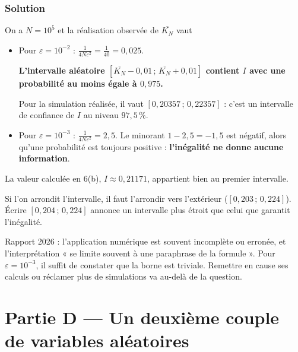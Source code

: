 \documentclass[11pt,a4paper]{article}
\newcommand{\equationajustee}[1]{%
  \sbox{\boiteequation}{$\displaystyle #1$}%
  \ifdim\wd\boiteequation>\linewidth
    \[\resizebox{\linewidth}{!}{\usebox{\boiteequation}}\]%
  \else
    \[#1\]%
  \fi}
\begin{document}
\hypertarget{solution-35}{%
\subsubsection{Solution}\label{solution-35}}

On a \(N=10^5\) et la réalisation observée de \(\overline{K_N}\) vaut

\equationajustee{\overline{K_N}=\frac{21\,357}{100\,000}=0{,}21357.}

\begin{itemize}
\item
  Pour \(\varepsilon=10^{-2}\) : \(\frac1{4N\varepsilon^2}=\frac1{40}=0{,}025\).

  \textbf{L'intervalle aléatoire \([\overline{K_N}-0{,}01\,;\,\overline{K_N}+0{,}01]\) contient \(I\) avec une probabilité au moins égale à \(0{,}975\).}

  Pour la simulation réalisée, il vaut \([0{,}20357\,;\,0{,}22357]\) : c'est un intervalle de confiance de \(I\) au niveau \(97{,}5\,\%\).
\item
  Pour \(\varepsilon=10^{-3}\) : \(\frac1{4N\varepsilon^2}=2{,}5\). Le minorant \(1-2{,}5=-1{,}5\) est négatif, alors qu'une probabilité est toujours positive : \textbf{l'inégalité ne donne aucune information}.
\end{itemize}

La valeur calculée en 6(b), \(I\approx0{,}21171\), appartient bien au premier intervalle.

\begin{piege}

Si l'on arrondit l'intervalle, il faut l'arrondir vers l'extérieur (\([0{,}203\,;\,0{,}224]\)). Écrire \([0{,}204\,;\,0{,}224]\) annonce un intervalle plus étroit que celui que garantit l'inégalité.

\end{piege}

\begin{jury}

Rapport 2026 : l'application numérique est souvent incomplète ou erronée, et l'interprétation « se limite souvent à une paraphrase de la formule ». Pour \(\varepsilon=10^{-3}\), il suffit de constater que la borne est triviale. Remettre en cause ses calculs ou réclamer plus de simulations va au-delà de la question.

\end{jury}

\hypertarget{partie-d-un-deuxiuxe8me-couple-de-variables-aluxe9atoires}{%
\section{Partie D --- Un deuxième couple de variables aléatoires}\label{partie-d-un-deuxiuxe8me-couple-de-variables-aluxe9atoires}}
\end{document}

